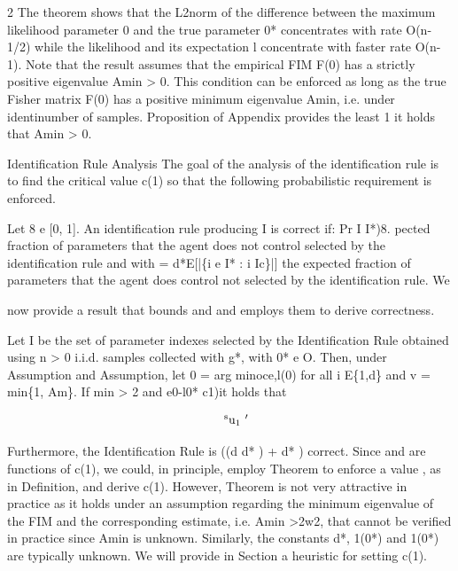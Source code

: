 \documentclass{article}
\begin{document}
\begin{paracol}{2}
The theorem shows that the L2norm of the difference between the maximum likelihood parameter 0 and the true parameter 0* concentrates with rate O(n-1/2) while the likelihood  and its expectation l concentrate with faster rate
O(n-1). Note that the result assumes that the empirical FIM
F(0) has a strictly positive eigenvalue Amin > 0. This condition can be enforced as long as the true Fisher matrix F(0)
has a positive minimum eigenvalue Amin, i.e. under identinumber of samples. Proposition of Appendix provides the
least 1   it holds that Amin > 0.


Identification Rule Analysis The goal of the analysis of
the identification rule is to find the critical value c(1) so that
the following probabilistic requirement is enforced.


Let 8 e [0, 1]. An identification rule producing I is 
correct if: Pr I  I*)8.
pected fraction of parameters that the agent does not control
selected by the identification rule and with  = d*E[|\{i e
I* : i  Ic\}|] the expected fraction of parameters that the
agent does control not selected by the identification rule. We

\switchcolumn
\RaggedRight

now provide a result that bounds  and  and employs them
to derive correctness.


Let I be the set of parameter indexes selected by the
Identification Rule obtained using n > 0 i.i.d. samples
collected with g*, with 0* e O. Then, under Assumption and Assumption, let 0 = arg minoce,l(0) for all
i E\{1,d\} and v = min\{1, Am\}. If min > 2 and
e0-l0* c1)it holds that


\begin{equation}
\begin{array} { r l } & { \mathrm { ~ ^ { s } u _ { 1 } ~'~ }}\end{array}
\end{equation}


Furthermore, the Identification Rule is ((d  d* ) + d* )
correct.
Since  and  are functions of c(1), we could, in principle, employ Theorem to enforce a value , as in Definition, and derive c(1). However, Theorem is not very attractive in practice as it holds under an assumption regarding the
minimum eigenvalue of the FIM and the corresponding estimate, i.e. Amin >2w2, that cannot be verified in practice
since Amin is unknown. Similarly, the constants d*, 1(0*)
and 1(0*) are typically unknown. We will provide in Section
a heuristic for setting c(1).



\end{paracol}
\end{document}
